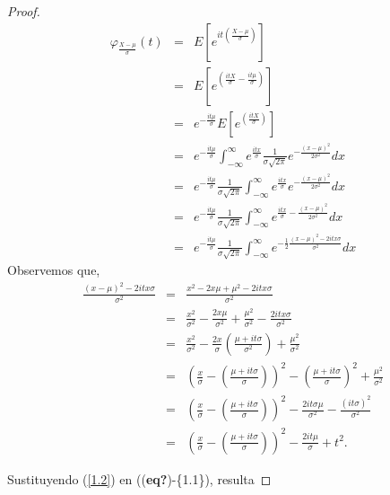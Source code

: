 \documentclass[
  letterpaper,
  DIV=11,
  numbers=noendperiod]{scrreprt}
\theoremstyle{definition}
\theoremstyle{plain}
\theoremstyle{remark}
\begin{document}
\begin{proof}
\begin{eqnarray}\label{1.1}
\varphi_{\frac{X-\mu}{\sigma}}(t) & = & E\left[e^{it\left(\frac{X-\mu}{\sigma}\right)}\right]\nonumber\\
& = & E\left[e^{\left(\frac{itX}{\sigma}-\frac{it\mu}{\sigma}\right)}\right]\nonumber\\
& = & e^{-\frac{it\mu}{\sigma}}E\left[e^{\left(\frac{itX}{\sigma}\right)}\right]\nonumber\\
& = & e^{-\frac{it\mu}{\sigma}}\int_{-\infty}^{\infty}e^{\frac{itx}{\sigma}}\frac{1}{\sigma\sqrt{2\pi}}e^{-\frac{(x-\mu)^{2}}{2\sigma^{2}}}dx\nonumber\\
& = & e^{-\frac{it\mu}{\sigma}}\frac{1}{\sigma\sqrt{2\pi}}\int_{-\infty}^{\infty}e^{\frac{itx}{\sigma}}e^{-\frac{(x-\mu)^{2}}{2\sigma^{2}}}dx\nonumber\\
& = & e^{-\frac{it\mu}{\sigma}}\frac{1}{\sigma\sqrt{2\pi}}\int_{-\infty}^{\infty}e^{\frac{itx}{\sigma}-\frac{(x-\mu)^{2}}{2\sigma^{2}}}dx\nonumber\\
& = & e^{-\frac{it\mu}{\sigma}}\frac{1}{\sigma\sqrt{2\pi}}\int_{-\infty}^{\infty}e^{-\frac{1}{2}\frac{(x-\mu)^{2}-2itx\sigma}{\sigma^{2}}}dx
\end{eqnarray} Observemos que, \begin{eqnarray}\label{1.2}
\frac{(x-\mu)^{2}-2itx\sigma}{\sigma^{2}} & = & \frac{x^{2}-2x\mu+\mu^{2}-2itx\sigma}{\sigma^{2}}\nonumber\\
& = & \frac{x^{2}}{\sigma^{2}}-\frac{2x\mu}{\sigma^{2}}+\frac{\mu^{2}}{\sigma^{2}}-\frac{2itx\sigma}{\sigma^{2}}\nonumber\\
& = & \frac{x^{2}}{\sigma^{2}}-\frac{2x}{\sigma}\left(\frac{\mu+it\sigma}{\sigma^{2}}\right)+\frac{\mu^{2}}{\sigma^{2}}\nonumber\\
& = & \left(\frac{x}{\sigma}-\left(\frac{\mu+it\sigma}{\sigma}\right)\right)^{2}-\left(\frac{\mu+it\sigma}{\sigma}\right)^{2}+\frac{\mu^{2}}{\sigma^{2}}\nonumber\\
& = & \left(\frac{x}{\sigma}-\left(\frac{\mu+it\sigma}{\sigma}\right)\right)^{2}-\frac{2 it\sigma\mu}{\sigma^{2}}-\frac{(it\sigma)^{2}}{\sigma^{2}}\nonumber\\
& = & \left(\frac{x}{\sigma}-\left(\frac{\mu+it\sigma}{\sigma}\right)\right)^{2}-\frac{2 it\mu}{\sigma}+t^{2}.
\end{eqnarray}

Sustituyendo (\ref{1.2}) en ((\textbf{eq?})-\{1.1\}), resulta


\end{proof}
\end{document}

